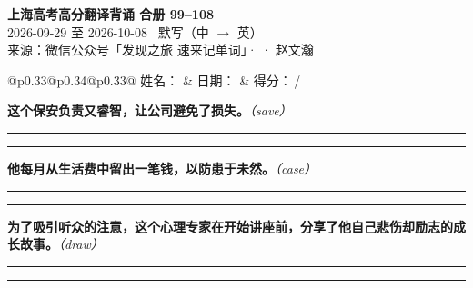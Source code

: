 \documentclass[11pt,a4paper]{article}
\newcommand{\num}[1]{\makebox[1.9em][r]{#1.}\hspace{0.3em}}
\newcommand{\wline}{\noindent\rule{\linewidth}{0.4pt}}
\newcommand{\prompt}[1]{\emph{\textcolor{tipblue}{\small（#1）}}}
\begin{document}
\pagestyle{plain}
\begin{center}
{\LARGE\bfseries 上海高考高分翻译背诵 \quad 合册 99–108}\\[0.25em]
{\large 2026-09-29 至 2026-10-08 \quad\ 默写（中 $\to$ 英）}\\[0.35em]
{\footnotesize 来源：微信公众号「发现之旅 速来记单词」·  · 赵文瀚}
\end{center}

\vspace{0.4em}
\noindent\begin{tabular}{@{}p{0.33\textwidth}@{}p{0.34\textwidth}@{}p{0.33\textwidth}@{}}
姓名：\underline{\hspace{2.0cm}} & 日期：\underline{\hspace{2.0cm}} & 得分：\underline{\hspace{1.4cm}}\,/ \\
\end{tabular}

\vspace{0.5em}

\vspace{0.8em}
\vspace{0.35em}\vspace{0.15em}

\begin{minipage}{\linewidth}

\num{1}\textbf{这个保安负责又睿智，让公司避免了损失。}\prompt{save}

\vspace{0.3em}

\wline\vspace{0.3em}
\wline

\end{minipage}

\begin{minipage}{\linewidth}

\num{2}\textbf{他每月从生活费中留出一笔钱，以防患于未然。}\prompt{case}

\vspace{0.3em}

\wline\vspace{0.3em}
\wline

\end{minipage}

\begin{minipage}{\linewidth}

\num{3}\textbf{为了吸引听众的注意，这个心理专家在开始讲座前，分享了他自己悲伤却励志的成长故事。}\prompt{draw}

\vspace{0.3em}

\wline\vspace{0.3em}
\wline

\end{minipage}
\end{document}
